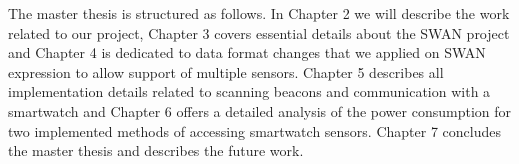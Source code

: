 The master thesis is structured as follows. In Chapter 2 we will describe the work related to our project, Chapter 3 covers  essential details about the SWAN project and Chapter 4 is dedicated to 
data format changes that we applied on SWAN  expression to allow support of multiple sensors. Chapter 5 describes all implementation details related to scanning beacons and communication
with a smartwatch and Chapter 6 offers a detailed analysis of the power consumption for two implemented methods of accessing smartwatch sensors. Chapter 7 concludes the master thesis and describes 
the future work.
